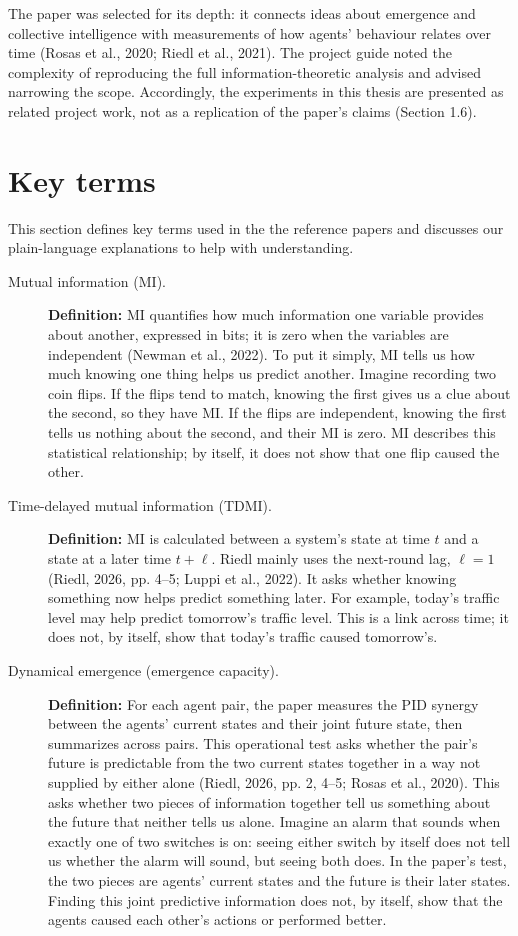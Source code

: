 \documentclass[12pt,a4paper,oneside]{report}
\begin{document}
The paper was selected for its depth: it connects ideas about emergence and collective intelligence with measurements of how agents’ behaviour relates over time (Rosas et al., 2020; Riedl et al., 2021). The project guide noted the complexity of reproducing the full information-theoretic analysis and advised narrowing the scope. Accordingly, the experiments in this thesis are presented as related project work, not as a replication of the paper’s claims (Section 1.6).

\section{Key terms}
This section defines key terms used in the the reference papers and discusses our plain-language explanations to help with understanding.
\begin{description}
\item[Mutual information (MI).]
\textbf{Definition:} MI quantifies how much information one variable provides about another, expressed in bits; it is zero when the variables are independent (Newman et al., 2022).
To put it simply, MI tells us how much knowing one thing helps us predict another. Imagine recording two coin flips. If the flips tend to match, knowing the first gives us a clue about the second, so they have MI. If the flips are independent, knowing the first tells us nothing about the second, and their MI is zero. MI describes this statistical relationship; by itself, it does not show that one flip caused the other.

\item[Time-delayed mutual information (TDMI).]
\textbf{Definition:} MI is calculated between a system’s state at time \(t\) and a state at a later time \(t+\ell\). Riedl mainly uses the next-round lag, \(\ell=1\) (Riedl, 2026, pp. 4–5; Luppi et al., 2022).
It asks whether knowing something now helps predict something later. For example, today's traffic level may help predict tomorrow's traffic level. This is a link across time; it does not, by itself, show that today's traffic caused tomorrow's.

\item[Dynamical emergence (emergence capacity).]
\textbf{Definition:} For each agent pair, the paper measures the PID synergy between the agents’ current states and their joint future state, then summarizes across pairs. This operational test asks whether the pair’s future is predictable from the two current states together in a way not supplied by either alone (Riedl, 2026, pp. 2, 4–5; Rosas et al., 2020).
This asks whether two pieces of information together tell us something about the future that neither tells us alone. Imagine an alarm that sounds when exactly one of two switches is on: seeing either switch by itself does not tell us whether the alarm will sound, but seeing both does. In the paper's test, the two pieces are agents' current states and the future is their later states. Finding this joint predictive information does not, by itself, show that the agents caused each other's actions or performed better.


\end{description}
\end{document}
